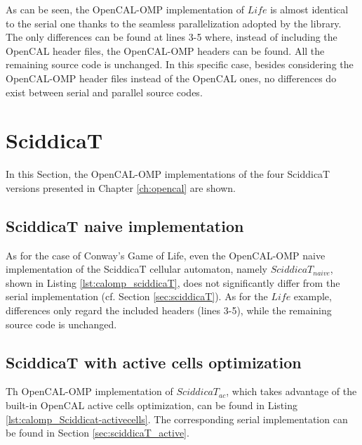 

As can be seen, the OpenCAL-OMP implementation of $Life$ is almost
identical to the serial one thanks to the seamless parallelization
adopted by the library. The only differences can be found at lines 3-5
where, instead of including the OpenCAL header files, the OpenCAL-OMP
headers can be found. All the remaining source code is unchanged. In
this specific case, besides considering the OpenCAL-OMP header files
instead of the OpenCAL ones, no differences do exist between serial
and parallel source codes.


\section{SciddicaT}

In this Section, the OpenCAL-OMP implementations of the four SciddicaT
versions presented in Chapter \ref{ch:opencal} are shown.

\subsection{SciddicaT naive implementation}

As for the case of Conway's Game of Life, even the OpenCAL-OMP naive
implementation of the SciddicaT cellular automaton, namely
$SciddicaT_{naive}$, shown in Listing \ref{lst:calomp_sciddicaT}, does
not significantly differ from the serial implementation (cf. Section
\ref{sec:sciddicaT}). As for the $Life$ example, differences only
regard the included headers (lines 3-5), while the remaining source
code is unchanged.



\subsection{SciddicaT with active cells optimization}
Th OpenCAL-OMP implementation of $SciddicaT_{ac}$, which takes
advantage of the built-in OpenCAL active cells optimization, can be
found in Listing \ref{lst:calomp_Sciddicat-activecells}. The
corresponding serial implementation can be found in Section
\ref{sec:sciddicaT_active}.

